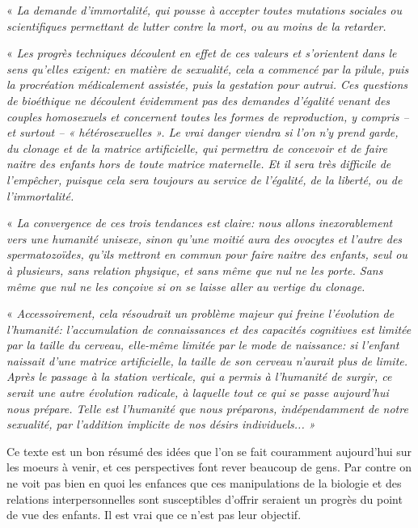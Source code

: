 « \emph{\tertio La demande d'immortalité, qui pousse à accepter toutes mutations sociales ou scientifiques permettant de lutter contre la mort, ou au moins de la retarder.}
 
« \emph{\quarto Les progrès techniques découlent en effet de ces valeurs et s'orientent dans le sens qu'elles exigent: en matière de sexualité, cela a commencé par la pilule, puis la procréation médicalement assistée, puis la gestation pour autrui. Ces questions de bioéthique ne découlent évidemment pas des demandes d'égalité venant des couples homosexuels et concernent toutes les formes de reproduction, y compris -- et surtout -- « hétérosexuelles ». Le vrai danger viendra si l'on n'y prend garde, du clonage et de la matrice artificielle, qui permettra de concevoir et de faire naitre des enfants hors de toute matrice maternelle. Et il sera très difficile de l'empêcher, puisque cela sera toujours au service de l'égalité, de la liberté, ou de l'immortalité.}
 
« \emph{ La convergence de ces trois tendances est claire: nous allons inexorablement vers une humanité unisexe, sinon qu'une moitié aura des ovocytes et l'autre des spermatozoïdes, qu'ils mettront en commun pour faire naitre des enfants, seul ou à plusieurs, sans relation physique, et sans même que nul ne les porte. Sans même que nul ne les conçoive si on se laisse aller au vertige du clonage.}
 
« \emph{ Accessoirement, cela résoudrait un problème majeur qui freine l'évolution de l'humanité: l'accumulation de connaissances et des capacités cognitives est limitée par la taille du cerveau, elle-même limitée par le mode de naissance: si l'enfant naissait d'une matrice artificielle, la taille de son cerveau n'aurait plus de limite. Après le passage à la station verticale, qui a permis à l'humanité de surgir, ce serait une autre évolution radicale, à laquelle tout ce qui se passe aujourd'hui nous prépare. Telle est l'humanité que nous préparons, indépendamment de notre sexualité, par l'addition implicite de nos désirs individuels... » }


 Ce texte est un bon résumé des idées que l'on se fait couramment aujourd'hui sur les moeurs à venir, et ces perspectives font rever beaucoup de gens. Par contre on ne voit pas bien en quoi les enfances que ces manipulations de la biologie et des relations interpersonnelles sont susceptibles d'offrir seraient un progrès du point de vue des enfants. Il est vrai que ce n'est pas leur objectif. 
 
